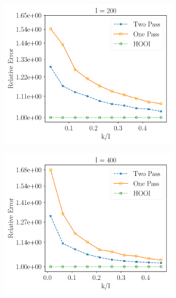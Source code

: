 \begin{figure}[H]
\begin{subfigure}{0.32\textwidth}
    \includegraphics[scale = 0.3]{figure/lk_hnoise_n200.pdf}
    \end{subfigure}
    \begin{subfigure}{0.32\textwidth}
    \includegraphics[scale = 0.3]{figure/lk_hnoise_n400.pdf}
    \end{subfigure}
    \begin{subfigure}{0.32\textwidth}

\end{subfigure}
\end{figure}
